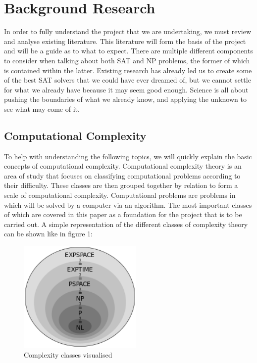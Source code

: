 \documentclass{article}
\begin{document}
\newpage
\section{Background Research}
In order to fully understand the project that we are undertaking, we must review and analyse existing literature. This literature will form
the basis of the project and will be a guide as to what to expect. There are multiple different components to consider when talking about
both SAT and NP problems, the former of which is contained within the latter. Existing research has already led us to create some of the
best SAT solvers that we could have ever dreamed of, but we cannot settle for what we already have because it may seem good enough. Science
is all about pushing the boundaries of what we already know, and applying the unknown to see what may come of it.

\subsection{Computational Complexity}
To help with understanding the following topics, we will quickly explain the basic concepts of computational complexity. Computational
complexity theory is an area of study that focuses on classifying computational problems according to their difficulty. These classes are
then grouped together by relation to form a scale of computational complexity. Computational problems are problems in which will be solved
by a computer via an algorithm. The most important classes of which are covered in this paper as a foundation for the project that is to be
carried out. A simple representation of the different classes of complexity theory can be shown like in figure 1:

\begin{figure}[h]
    \caption{Complexity classes visualised \cite{complex}}
    \includegraphics[width=6cm]{complexity.png}
    \centering
\end{figure}
\end{document}

